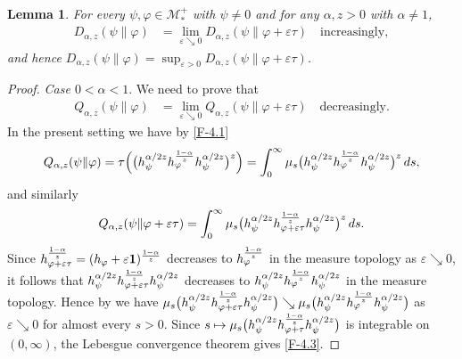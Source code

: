 \documentclass[12pt]{article}
\newtheorem{lemma}[theorem]{Lemma}
\theoremstyle{definition}
\theoremstyle{remark}
\numberwithin{equation}{section}
\def\Me{\mathcal M}
\def\ffi{\varphi}
\def\1{\mathbf{1}}
\def\eps{\varepsilon}
\begin{document}
\begin{lemma}\label{L-4.1}
For every $\psi,\ffi\in\Me_*^+$ with $\psi\ne0$ and for any $\alpha,z>0$ with $\alpha\ne1$,
\begin{align}\label{F-4.2}
D_{\alpha,z}(\psi\|\ffi)&=\lim_{\eps\searrow0}D_{\alpha,z}(\psi\|\ffi+\eps\tau)\quad\mbox{increasingly},
\end{align}
and hence $D_{\alpha,z}(\psi\|\ffi)=\sup_{\eps>0}D_{\alpha,z}(\psi\|\ffi+\eps\tau)$.
\end{lemma}

\begin{proof}
{\it Case $0<\alpha<1$}.\enspace
We need to prove that
\begin{align}\label{F-4.3}
Q_{\alpha,z}(\psi\|\ffi)&=\lim_{\eps\searrow0}Q_{\alpha,z}(\psi\|\ffi+\eps\tau)\quad\mbox{decreasingly}.
\end{align}
In the present setting we have by \eqref{F-4.1}
\begin{align}\label{F-4.4}
Q_{\alpha,z}(\psi\|\ffi)
=\tau\Bigl(\bigl(h_\psi^{\alpha/2z}h_\ffi^{1-\alpha\over z}h_\psi^{\alpha/2z}\bigr)^z\Bigr)
=\int_0^\infty\mu_s\bigl(h_\psi^{\alpha/2z}h_\ffi^{1-\alpha\over z}h_\psi^{\alpha/2z}\bigr)^z\,ds,
\end{align}
and similarly
\[
Q_{\alpha,z}(\psi\|\ffi+\eps\tau)
=\int_0^\infty\mu_s\bigl(h_\psi^{\alpha/2z}h_{\ffi+\eps\tau}^{1-\alpha\over z}h_\psi^{\alpha/2z}\bigr)^z\,ds.
\]
Since $h_{\ffi+\eps\tau}^{1-\alpha\over z}=(h_\ffi+\eps\1)^{1-\alpha\over z}$ decreases to
$h_\ffi^{1-\alpha\over z}$ in the measure topology as $\eps\searrow0$, it follows that
$h_\psi^{\alpha/2z}h_{\ffi+\eps\tau}^{1-\alpha\over z}h_\psi^{\alpha/2z}$ decreases to
$h_\psi^{\alpha/2z}h_\ffi^{1-\alpha\over z}h_\psi^{\alpha/2z}$ in the measure topology. Hence by
\cite[Lemma 3.4]{fack1986generalized} we have
$\mu_s\bigl(h_\psi^{\alpha/2z}h_{\ffi+\eps\tau}^{1-\alpha\over z}h_\psi^{\alpha/2z}\bigr)
\searrow\mu_s\bigl(h_\psi^{\alpha/2z}h_\ffi^{1-\alpha\over z}h_\psi^{\alpha/2z}\bigr)$
as $\eps\searrow0$ for almost every $s>0$. Since
$s\mapsto\mu_s\bigl(h_\psi^{\alpha/2z}h_{\ffi+\tau}^{1-\alpha\over z}h_\psi^{\alpha/2z}\bigr)$ is
integrable on $(0,\infty)$, the Lebesgue convergence theorem gives \eqref{F-4.3}.


\end{proof}
\end{document}
